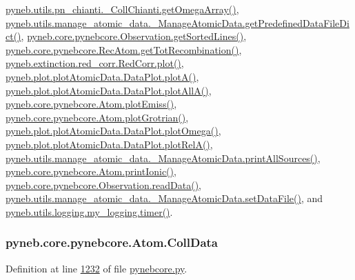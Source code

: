 \hyperlink{pn__chianti_8py_source_l00461}{pyneb.\+utils.\+pn\+\_\+chianti.\+\_\+\+Coll\+Chianti.\+get\+Omega\+Array()}, \hyperlink{manage__atomic__data_8py_source_l00034}{pyneb.\+utils.\+manage\+\_\+atomic\+\_\+data.\+\_\+\+Manage\+Atomic\+Data.\+get\+Predefined\+Data\+File\+Dict()}, \hyperlink{pynebcore_8py_source_l03562}{pyneb.\+core.\+pynebcore.\+Observation.\+get\+Sorted\+Lines()}, \hyperlink{pynebcore_8py_source_l02735}{pyneb.\+core.\+pynebcore.\+Rec\+Atom.\+get\+Tot\+Recombination()}, \hyperlink{red__corr_8py_source_l00303}{pyneb.\+extinction.\+red\+\_\+corr.\+Red\+Corr.\+plot()}, \hyperlink{plot_atomic_data_8py_source_l00116}{pyneb.\+plot.\+plot\+Atomic\+Data.\+Data\+Plot.\+plot\+A()}, \hyperlink{plot_atomic_data_8py_source_l00188}{pyneb.\+plot.\+plot\+Atomic\+Data.\+Data\+Plot.\+plot\+All\+A()}, \hyperlink{pynebcore_8py_source_l02313}{pyneb.\+core.\+pynebcore.\+Atom.\+plot\+Emiss()}, \hyperlink{pynebcore_8py_source_l02372}{pyneb.\+core.\+pynebcore.\+Atom.\+plot\+Grotrian()}, \hyperlink{plot_atomic_data_8py_source_l00372}{pyneb.\+plot.\+plot\+Atomic\+Data.\+Data\+Plot.\+plot\+Omega()}, \hyperlink{plot_atomic_data_8py_source_l00261}{pyneb.\+plot.\+plot\+Atomic\+Data.\+Data\+Plot.\+plot\+Rel\+A()}, \hyperlink{manage__atomic__data_8py_source_l00431}{pyneb.\+utils.\+manage\+\_\+atomic\+\_\+data.\+\_\+\+Manage\+Atomic\+Data.\+print\+All\+Sources()}, \hyperlink{pynebcore_8py_source_l02167}{pyneb.\+core.\+pynebcore.\+Atom.\+print\+Ionic()}, \hyperlink{pynebcore_8py_source_l03589}{pyneb.\+core.\+pynebcore.\+Observation.\+read\+Data()}, \hyperlink{manage__atomic__data_8py_source_l00380}{pyneb.\+utils.\+manage\+\_\+atomic\+\_\+data.\+\_\+\+Manage\+Atomic\+Data.\+set\+Data\+File()}, and \hyperlink{logging_8py_source_l00115}{pyneb.\+utils.\+logging.\+my\+\_\+logging.\+timer()}.

\hypertarget{classpyneb_1_1core_1_1pynebcore_1_1_atom_a976816067ec07396b4e27cfccbf15573}{}
\subsubsection[{Coll\+Data}]{\setlength{\rightskip}{0pt plus 5cm}pyneb.\+core.\+pynebcore.\+Atom.\+Coll\+Data}\label{classpyneb_1_1core_1_1pynebcore_1_1_atom_a976816067ec07396b4e27cfccbf15573}


Definition at line \hyperlink{pynebcore_8py_source_l01232}{1232} of file \hyperlink{pynebcore_8py_source}{pynebcore.\+py}.




